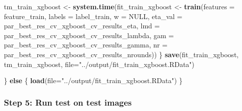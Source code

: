 \documentclass[
]{article}
\newenvironment{Shaded}{\begin{snugshade}}{\end{snugshade}}
\newcommand{\ControlFlowTok}[1]{\textcolor[rgb]{0.13,0.29,0.53}{\textbf{#1}}}
\newcommand{\DataTypeTok}[1]{\textcolor[rgb]{0.13,0.29,0.53}{#1}}
\newcommand{\DecValTok}[1]{\textcolor[rgb]{0.00,0.00,0.81}{#1}}
\newcommand{\FloatTok}[1]{\textcolor[rgb]{0.00,0.00,0.81}{#1}}
\newcommand{\KeywordTok}[1]{\textcolor[rgb]{0.13,0.29,0.53}{\textbf{#1}}}
\newcommand{\NormalTok}[1]{#1}
\newcommand{\OperatorTok}[1]{\textcolor[rgb]{0.81,0.36,0.00}{\textbf{#1}}}
\newcommand{\OtherTok}[1]{\textcolor[rgb]{0.56,0.35,0.01}{#1}}
\newcommand{\StringTok}[1]{\textcolor[rgb]{0.31,0.60,0.02}{#1}}
\begin{document}
\begin{Shaded}
\begin{Highlighting}[]
\NormalTok{    tm_train_xgboost <-}\StringTok{ }\KeywordTok{system.time}\NormalTok{(fit_train_xgboost <-}\StringTok{ }\KeywordTok{train}\NormalTok{(}\DataTypeTok{features =}\NormalTok{ feature_train, }\DataTypeTok{labels =}\NormalTok{ label_train,}
                                                                 \DataTypeTok{w =}  \OtherTok{NULL}\NormalTok{, }
                                                                 \DataTypeTok{eta_val =}\NormalTok{ par_best_res_cv_xgboost_cv_results_eta, }
                                                                 \DataTypeTok{lmd =}\NormalTok{ par_best_res_cv_xgboost_cv_results_lambda,}
                                                                 \DataTypeTok{gam =}\NormalTok{ par_best_res_cv_xgboost_cv_results_gamma,}
                                                                 \DataTypeTok{nr =}\NormalTok{ par_best_res_cv_xgboost_cv_results_nrounds))}
\NormalTok{  \}}
  \KeywordTok{save}\NormalTok{(fit_train_xgboost, tm_train_xgboost, }\DataTypeTok{file=}\StringTok{"../output/fit_train_xgboost.RData"}\NormalTok{)}
  
\NormalTok{\} }\ControlFlowTok{else}\NormalTok{ \{}
  \KeywordTok{load}\NormalTok{(}\DataTypeTok{file=}\StringTok{"../output/fit_train_xgboost.RData"}\NormalTok{)}
\NormalTok{\}}
\end{Highlighting}
\end{Shaded}

\hypertarget{step-5-run-test-on-test-images-1}{%
\subsubsection{Step 5: Run test on test
images}\label{step-5-run-test-on-test-images-1}}

\begin{Shaded}
\end{Shaded}
\end{document}
